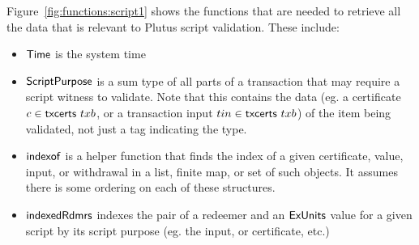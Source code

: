Figure~\ref{fig:functions:script1} shows the functions that are needed to
retrieve all the data that is relevant to Plutus script validation.
These include:

\begin{itemize}
\item $\mathsf{Time}$ is the system time
\item
  $\mathsf{ScriptPurpose}$ is a sum type of all parts of a transaction that may
  require a script witness to validate. Note that this contains the data
  (eg. a certificate $c \in \mathsf{txcerts}~{txb}$,
  or a transaction input $tin \in \mathsf{txcerts}~{txb}$) of the item being validated,
  not just a tag indicating the type.
\item
  $\mathsf{indexof}$ is a helper function that finds the index of a given certificate, value, input, or
  withdrawal in a list, finite map, or set of such objects.
  It assumes there is some ordering on each of these structures.
\item
  $\mathsf{indexedRdmrs}$ indexes the pair of a redeemer and an $\mathsf{ExUnits}$ value
  for a given script by its script purpose (eg. the input, or certificate, etc.)
\end{itemize}


